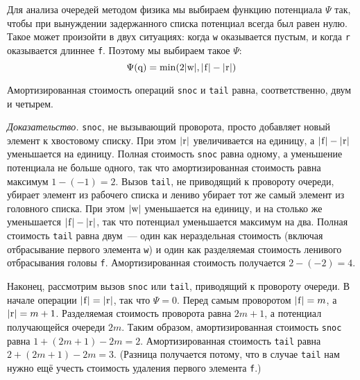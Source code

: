 Для анализа очередей методом физика мы выбираем функцию потенциала
$\Psi$ так, чтобы при вынуждении задержанного списка потенциал всегда был
равен нулю. Такое может произойти в двух ситуациях: когда
\lstinline!w! оказывается пустым, и когда \lstinline!r! оказывается
длиннее \lstinline!f!. Поэтому мы выбираем такое $\Psi$:
$$
\Psi(\lstinline!q!) = \min(2|\lstinline!w!|, |\lstinline!f!| - |\lstinline!r!|)
$$
\begin{theorem}\label{th:6.2}
  Амортизированная стоимость операций \lstinline!snoc! и
  \lstinline!tail! равна, соответственно, двум и четырем.

  \emph{Доказательство.} \lstinline!snoc!, не вызывающий проворота,
  просто добавляет новый элемент к хвостовому списку. При этом
  $|\lstinline!r!|$ увеличивается на единицу, а $|\lstinline!f!| -
  |\lstinline!r!|$ уменьшается на единицу. Полная стоимость
  \lstinline!snoc! равна одному, а уменьшение потенциала не больше
  одного, так что амортизированная стоимость равна максимум $1 - (-1)
  = 2$. Вызов \lstinline!tail!, не приводящий к провороту очереди,
  убирает элемент из рабочего списка и лениво убирает тот же самый
  элемент из головного списка. При этом $|\lstinline!w!|$ уменьшается
  на единицу, и на столько же уменьшается $|\lstinline!f!| -
  |\lstinline!r!|$, так что потенциал уменьшается максимум на два.
  Полная стоимость \lstinline!tail! равна двум~--- один как
  нераздельная стоимость (включая отбрасывание первого элемента
  \lstinline!w!) и один как разделяемая стоимость ленивого
  отбрасывания головы \lstinline!f!. Амортизированная стоимость
  получается $2 - (-2) = 4$.

  Наконец, рассмотрим вызов \lstinline!snoc! или \lstinline!tail!,
  приводящий к провороту очереди. В начале операции $|\lstinline!f!|
  = |\lstinline!r!|$, так что $\Psi = 0$. Перед самым проворотом
  $|\lstinline!f!| = m$, а $|\lstinline!r!| = m+1$. Разделяемая
  стоимость проворота равна $2m+1$, а потенциал получающейся очереди
  $2m$. Таким образом, амортизированная стоимость \lstinline!snoc!
  равна $1 + (2m + 1) - 2m = 2$. Амортизированная стоимость
  \lstinline!tail!  равна $2 + (2m + 1) - 2m = 3$. (Разница получается
  потому, что в случае \lstinline!tail! нам нужно ещё учесть стоимость
  удаления первого элемента \lstinline!f!.)
\end{theorem}

